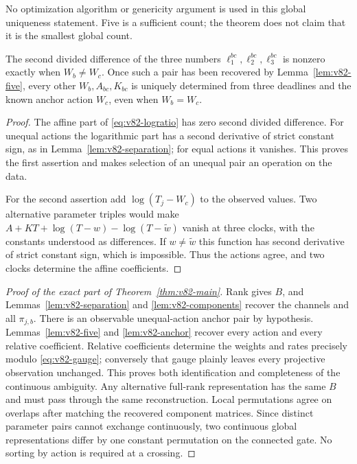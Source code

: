 No optimization algorithm or genericity argument is used in this global
uniqueness statement. Five is a sufficient count; the theorem does not
claim that it is the smallest global count.

\begin{lemma}
\label{lem:v82-anchor}
The second divided difference of the three numbers
$\ell_1^{bc},\ell_2^{bc},\ell_3^{bc}$ is nonzero exactly when
$W_b\ne W_c$. Once such a pair has been recovered by
Lemma~\ref{lem:v82-five}, every other $W_b,A_{bc},K_{bc}$ is uniquely
determined from three deadlines and the known anchor action $W_c$,
even when $W_b=W_c$.
\end{lemma}
\begin{proof}
The affine part of \eqref{eq:v82-logratio} has zero second divided
difference. For unequal actions the logarithmic part has a second
derivative of strict constant sign, as in
Lemma~\ref{lem:v82-separation}; for equal actions it vanishes.
This proves the first assertion and makes selection of an unequal pair
an operation on the data.

For the second assertion add $\log(T_j-W_c)$ to the observed values.
Two alternative parameter triples would make
$A+KT+\log(T-w)-\log(T-\widetilde w)$ vanish at three clocks,
with the constants understood as differences. If $w\ne\widetilde w$
this function has second derivative of strict constant sign, which is
impossible. Thus the actions agree, and two clocks determine the affine
coefficients.
\end{proof}

\begin{proof}[Proof of the exact part of Theorem~\ref{thm:v82-main}]
Rank gives $B$, and Lemmas~\ref{lem:v82-separation} and
\ref{lem:v82-components} recover the channels and all $\pi_{j,b}$.
There is an observable unequal-action anchor pair by hypothesis.
Lemmas~\ref{lem:v82-five} and \ref{lem:v82-anchor} recover every action
and every relative coefficient. Relative coefficients determine the
weights and rates precisely modulo \eqref{eq:v82-gauge}; conversely
that gauge plainly leaves every projective observation unchanged.
This proves both identification and completeness of the continuous
ambiguity. Any alternative full-rank representation has the same $B$
and must pass through the same reconstruction. Local permutations
agree on overlaps after matching the recovered component matrices.
Since distinct parameter pairs cannot exchange continuously, two
continuous global representations differ by one constant permutation
on the connected gate. No sorting by action is required at a crossing.
\end{proof}

